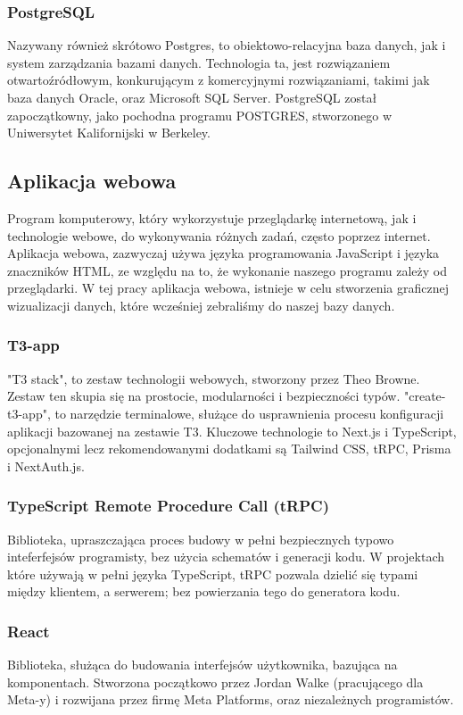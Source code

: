 \documentclass[a4paper, 12pt]{article}
\begin{document}
\subsubsection{PostgreSQL}
Nazywany również skrótowo Postgres, to obiektowo-relacyjna baza danych, jak i system zarządzania bazami danych. Technologia ta, jest rozwiązaniem otwartoźródłowym, konkurującym z komercyjnymi rozwiązaniami, takimi jak baza danych Oracle, oraz Microsoft SQL Server.\cite{postgresWhatis} PostgreSQL został zapoczątkowny, jako pochodna programu POSTGRES, stworzonego w Uniwersytet Kalifornijski w Berkeley.\cite{postgresHistory}
\subsection{Aplikacja webowa}
Program komputerowy, który wykorzystuje przeglądarkę internetową, jak i technologie webowe, do wykonywania różnych zadań, często poprzez internet. Aplikacja webowa, zazwyczaj używa języka programowania JavaScript i języka znaczników HTML, ze względu na to, że wykonanie naszego programu zależy od przeglądarki.\cite{stackpathWebapp} W tej pracy aplikacja webowa, istnieje w celu stworzenia graficznej wizualizacji danych, które wcześniej zebraliśmy do naszej bazy danych.
\subsubsection{T3-app}
"T3 stack", to zestaw technologii webowych, stworzony przez Theo Browne. Zestaw ten skupia się na prostocie, modularności i bezpieczności typów. "create-t3-app", to narzędzie terminalowe, służące do usprawnienia procesu konfiguracji aplikacji bazowanej na zestawie T3. Kluczowe technologie to Next.js i TypeScript, opcjonalnymi lecz rekomendowanymi dodatkami są Tailwind CSS, tRPC, Prisma i NextAuth.js.\cite{introT3}
\subsubsection{TypeScript Remote Procedure Call (tRPC)}
Biblioteka, upraszczająca proces budowy w pełni bezpiecznych typowo inteferfejsów programisty, bez użycia schematów i generacji kodu. W projektach które używają w pełni języka TypeScript, tRPC pozwala dzielić się typami między klientem, a serwerem; bez powierzania tego do generatora kodu.\cite{introTRPC}
\subsubsection{React}
Biblioteka, służąca do budowania interfejsów użytkownika, bazująca na komponentach. Stworzona początkowo przez Jordan Walke (pracującego dla Meta-y) i rozwijana przez firmę Meta Platforms, oraz niezależnych programistów.\cite{quickstartReact}\cite{honeypotReact}
\end{document}
